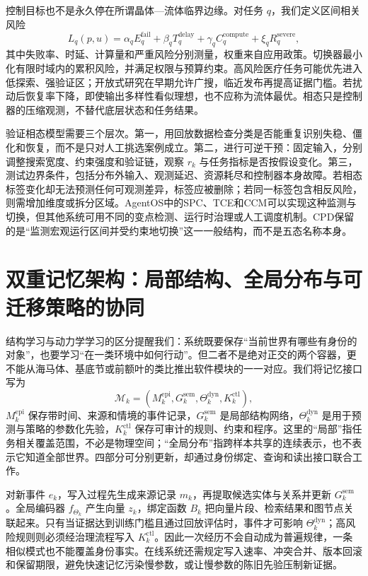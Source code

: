控制目标也不是永久停在所谓晶体—流体临界边缘。对任务 $q$，我们定义区间相关风险
\[
 L_q(p,u)=\alpha_q E_q^{\mathrm{fail}}+\beta_q T_q^{\mathrm{delay}}
 +\gamma_q C_q^{\mathrm{compute}}+\xi_q R_q^{\mathrm{severe}},
\]
其中失败率、时延、计算量和严重风险分别测量，权重来自应用政策。切换器最小化有限时域内的累积风险，并满足权限与预算约束。高风险医疗任务可能优先进入低探索、强验证区；开放式研究在早期允许广搜，临近发布再提高证据门槛。若扰动后恢复率下降，即使输出多样性看似理想，也不应称为流体最优。相态只是控制器的压缩观测，不替代底层状态和任务结果。

验证相态模型需要三个层次。第一，用回放数据检查分类是否能重复识别失稳、僵化和恢复，而不是只对人工挑选案例成立。第二，进行可逆干预：固定输入，分别调整搜索宽度、约束强度和验证链，观察 $r_k$ 与任务指标是否按假设变化。第三，测试边界条件，包括分布外输入、观测延迟、资源耗尽和控制器本身故障。若相态标签变化却无法预测任何可观测差异，标签应被删除；若同一标签包含相反风险，则需增加维度或拆分区域。AgentOS中的SPC、TCE和CCM可以实现这种监测与切换，但其他系统可用不同的变点检测、运行时治理或人工调度机制。CPD保留的是“监测宏观运行区间并受约束地切换”这一一般结构，而不是五态名称本身。

\section{双重记忆架构：局部结构、全局分布与可迁移策略的协同}
\label{sec:cpd_dual_memory_architecture}

结构学习与动力学学习的区分提醒我们：系统既要保存“当前世界有哪些有身份的对象”，也要学习“在一类环境中如何行动”。但二者不是绝对正交的两个容器，更不能从海马体、基底节或前额叶的类比推出软件模块的一一对应。我们将记忆接口写为
\[
 \mathcal{M}_k=(M_k^{\mathrm{epi}},G_k^{\mathrm{sem}},\Theta_k^{\mathrm{dyn}},K_k^{\mathrm{ctl}}),
\]
$M_k^{\mathrm{epi}}$ 保存带时间、来源和情境的事件记录，$G_k^{\mathrm{sem}}$ 是局部结构网络，$\Theta_k^{\mathrm{dyn}}$ 是用于预测与策略的参数化先验，$K_k^{\mathrm{ctl}}$ 保存可审计的规则、约束和程序。这里的“局部”指任务相关覆盖范围，不必是物理空间；“全局分布”指跨样本共享的连续表示，也不表示它知道全部世界。四部分可分别更新，却通过身份绑定、查询和读出接口联合工作。

对新事件 $e_k$，写入过程先生成来源记录 $m_k$，再提取候选实体与关系并更新 $G_k^{\mathrm{sem}}$。全局编码器 $f_{\Theta_k}$ 产生向量 $z_k$，绑定函数 $B_k$ 把向量片段、检索结果和图节点关联起来。只有当证据达到训练门槛且通过回放评估时，事件才可影响 $\Theta_k^{\mathrm{dyn}}$；高风险规则则必须经治理流程写入 $K_k^{\mathrm{ctl}}$。因此一次经历不会自动成为普遍规律，一条相似模式也不能覆盖身份事实。在线系统还需规定写入速率、冲突合并、版本回滚和保留期限，避免快速记忆污染慢参数，或让慢参数的陈旧先验压制新证据。


